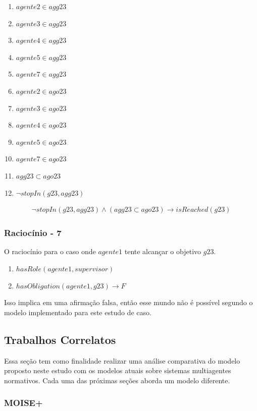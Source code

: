 \documentclass[12pt]{article}
\begin{document}
\begin{enumerate}
	\item $agente2 \in agg23$	
	\item $agente3 \in agg23$
	\item $agente4 \in agg23$
	\item $agente5 \in agg23$
	\item $agente7 \in agg23$								
	\item $agente2 \in ago23$	
	\item $agente3 \in ago23$
	\item $agente4 \in ago23$
	\item $agente5 \in ago23$
	\item $agente7 \in ago23$	
	\item $agg23 \subset ago23$
	\item $\neg stopIn(g23,agg23)$										
\end{enumerate}

\begin{eqnarray}\label{rel15}
	\neg stopIn(g23,agg23) \wedge (agg23 \subset ago23) \to isReached(g23)
\end{eqnarray}

\subsubsection{Raciocínio - 7}

O raciocínio para o caso onde $agente1$ tente alcançar o objetivo $g23$.  

\begin{enumerate}
	\item $hasRole(agente1,supervisor)$
	\item $hasObligation(agente1,g23) \to F$										
\end{enumerate}

Isso implica em uma afirmação falsa, então esse mundo não é possível segundo o modelo implementado para este estudo de caso.

\subsection{Trabalhos Correlatos}

Essa seção tem como finalidade realizar uma análise comparativa do modelo proposto neste estudo com os modelos atuais sobre sistemas multiagentes normativos. Cada uma das próximas seções aborda um modelo diferente.

\subsubsection{MOISE+}
\end{document}

